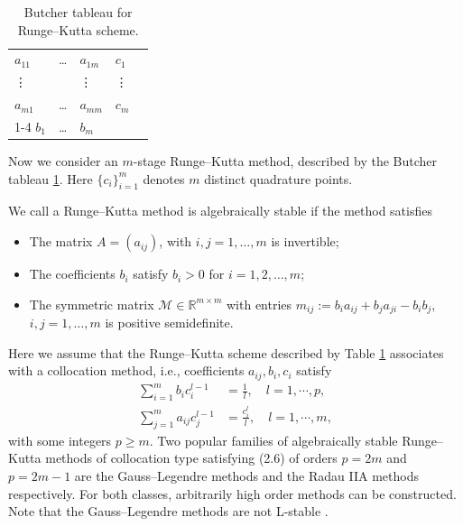 \documentclass[10pt,final,leqno,onefignum,onetabnum]{siamltex}%
\newcommand\red[1]{\textcolor{darkred}{#1}}
\begin{document}
\begin{table}[h]
\begin{center}
\begin{tabular}{lll|ll}
$a_{11}$  &\ldots &$a_{1m}$ &$c_1$  &  \\
\vdots    &       &\vdots   &\vdots &  \\
$a_{m1}$  &\ldots &$a_{mm}$ &$c_m$  &  \\ \cline{1-4}
$b_{1}$   &\ldots & $b_{m}$ & &
\end{tabular}
\end{center}
\caption{Butcher tableau for Runge--Kutta scheme.}\label{tab:RK}
\end{table}

Now we consider an $m$-stage Runge--Kutta method, described by the Butcher tableau \ref{tab:RK}. %
Here $\{c_i\}_{i=1}^m$ denotes $m$ distinct quadrature points.
\begin{definition}
We call a Runge--Kutta method is algebraically stable if the method satisfies
\begin{itemize}
\item[{\bf (P5)(a)}] The matrix $A = (a_{ij})$, with $i,j=1,\ldots,m$ is invertible;
\item[{\bf (P5)(b)}] The coefficients $b_i$ satisfy $b_i>0$ for $i=1,2,\dots,m$;
\item[{\bf (P5)(c)}] The  symmetric matrix $\mathcal{M}\in  \mathbb{R}^{m\times m }$
with entries $m_{ij} := b_ia_{ij} + b_ja_{ji} - b_ib_j$, $i, j = 1,\ldots,m$
is positive semidefinite. %
\end{itemize}
\end{definition}

Here we assume that the Runge--Kutta scheme described  by Table \ref{tab:RK}
associates with a collocation method, i.e., coefficients $a_{ij}, b_i, c_i$ satisfy
\begin{align}
        \sum_{i=1}^m b_i c_i^{l-1} &= \frac1l, \quad l = 1, \cdots, p,\label{eqn:accuracy} \\
        \sum_{j=1}^m a_{ij} c_j^{l-1} &= \frac{c_i^l}l, \quad l = 1, \cdots, m,\label{eqn:stage-order}
\end{align}
with some integers $p\ge m$. Two popular families of algebraically stable Runge--Kutta
methods of collocation type satisfying (2.6) of orders $p = 2m$ and $p = 2m - 1$
 are the Gauss--Legendre  methods and the Radau IIA methods respectively. For both classes,
arbitrarily high order methods can be constructed. Note that the Gauss--Legendre methods
are not L-stable \cite{HairerWanner:2010}.
\end{document}
